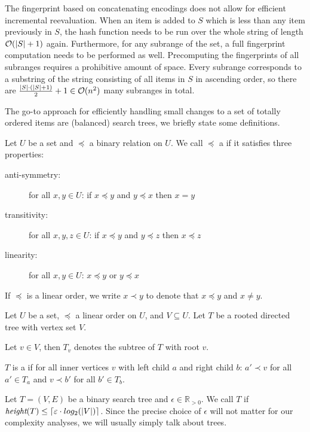 The fingerprint based on concatenating encodings does not allow for efficient incremental reevaluation. When an item is added to $S$ which is less than any item previously in $S$, the hash function needs to be run over the whole string of length $\complexity{\abs{S} + 1}$ again. Furthermore, for any subrange of the set, a full fingerprint computation needs to be performed as well. Precomputing the fingerprints of all subranges requires a prohibitive amount of space. Every subrange corresponds to a substring of the string consisting of all items in $S$ in ascending order, so there are $\frac{\abs{S} \cdot (\abs{S} + 1)}{2} + 1 \in \complexity{n^2}$ many subranges in total.

The go-to approach for efficiently handling small changes to a set of totally ordered items are (balanced) search trees, we briefly state some definitions.

\begin{definition}
Let $U$ be a set and $\preceq$ a binary relation on $U$.
We call $\preceq$ a  if it satisfies three properties:

  \begin{description}
    \item[anti-symmetry:] for all $x, y \in U$: if $x \preceq y$ and $y \preceq x$ then $x = y$
    \item[transitivity:] for all $x, y, z \in U$: if $x \preceq y$ and $y \preceq z$ then $x \preceq z$
    \item[linearity:] for all $x, y \in U$: $x \preceq y$ or $y \preceq x$
  \end{description}

If $\preceq$ is a linear order, we write $x \prec y$ to denote that $x \preceq y$ and $x \neq y$.
\end{definition}

\begin{definition}
Let $U$ be a set, $\preceq$ a linear order on $U$, and $V \subseteq U$. Let $T$ be a rooted directed tree with vertex set $V$.

Let $v \in V$, then $T_v$ denotes the subtree of $T$ with root $v$.

$T$ is a  if for all inner vertices $v$ with left child $a$ and right child $b$: $a' \prec v$ for all $a' \in T_a$ and $v \prec b'$ for all $b' \in T_b$.

\end{definition}

\begin{definition}
Let $T = (V, E)$ be a binary search tree and $\epsilon \in \mathbb{R}_{> 0}$.
We call $T$  if $\textit{height}(T) \leq \ceil*{\epsilon \cdot log_2(|V|)}$.
Since the precise choice of $\epsilon$ will not matter for our complexity analyses, we will usually simply talk about  trees.
\end{definition}

